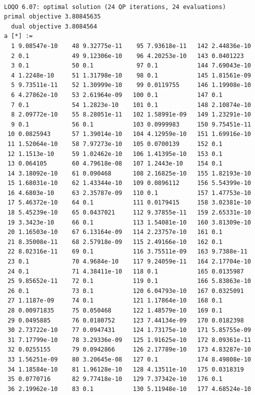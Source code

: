 \documentclass{article}
\begin{document}
\begin{verbatim}

LOQO 6.07: optimal solution (24 QP iterations, 24 evaluations)
primal objective 3.80845635
  dual objective 3.8084564
a [*] :=
  1 9.08547e-10    48 9.32775e-11    95 7.93618e-11   142 2.44836e-10
  2 0.1            49 9.12306e-10    96 4.20253e-10   143 0.0401223
  3 0.1            50 0.1            97 0.1           144 7.69043e-10
  4 1.2248e-10     51 1.31798e-10    98 0.1           145 1.81561e-09
  5 9.73511e-11    52 1.30999e-10    99 0.0119755     146 1.19908e-10
  6 4.27862e-10    53 2.61964e-09   100 0.1           147 0.1
  7 0.1            54 1.2823e-10    101 0.1           148 2.10874e-10
  8 2.09772e-10    55 8.28051e-11   102 1.58991e-09   149 1.23291e-10
  9 0.1            56 0.1           103 0.0999983     150 9.75451e-11
 10 0.0825943      57 1.39014e-10   104 4.12959e-10   151 1.69916e-10
 11 1.52064e-10    58 7.97273e-10   105 0.0700139     152 0.1
 12 1.1513e-10     59 1.02462e-10   106 1.41395e-10   153 0.1
 13 0.064105       60 4.79618e-08   107 1.2443e-10    154 0.1
 14 3.18092e-10    61 0.090468      108 2.16825e-10   155 1.82193e-10
 15 1.68031e-10    62 1.43344e-10   109 0.0896112     156 5.54399e-10
 16 4.6803e-10     63 2.35787e-09   110 0.1           157 1.47753e-10
 17 5.46372e-10    64 0.1           111 0.0179415     158 3.02381e-10
 18 5.45239e-10    65 0.0437021     112 9.37855e-11   159 2.65331e-10
 19 3.3423e-10     66 0.1           113 1.54081e-10   160 3.81309e-10
 20 1.16503e-10    67 6.13164e-09   114 2.23757e-10   161 0.1
 21 8.35008e-11    68 2.57918e-09   115 2.49166e-10   162 0.1
 22 8.02316e-11    69 0.1           116 3.75511e-09   163 9.7388e-11
 23 0.1            70 4.9684e-10    117 9.24059e-11   164 2.17704e-10
 24 0.1            71 4.38411e-10   118 0.1           165 0.0135987
 25 9.85652e-11    72 0.1           119 0.1           166 5.83863e-10
 26 0.1            73 0.1           120 6.04793e-10   167 0.0325091
 27 1.1187e-09     74 0.1           121 1.17864e-10   168 0.1
 28 0.00971835     75 0.050468      122 1.48579e-10   169 0.1
 29 0.0495885      76 0.0180752     123 7.44134e-09   170 0.0182398
 30 2.73722e-10    77 0.0947431     124 1.73175e-10   171 5.85755e-09
 31 7.17799e-10    78 3.29336e-09   125 1.91625e-10   172 8.09361e-11
 32 0.0255155      79 0.0942866     126 2.17789e-10   173 4.83287e-10
 33 1.56251e-09    80 3.20645e-08   127 0.1           174 8.49808e-10
 34 1.18584e-10    81 1.96128e-10   128 4.13511e-10   175 0.0318319
 35 0.0770716      82 9.77418e-10   129 7.37342e-10   176 0.1
 36 2.19962e-10    83 0.1           130 5.11948e-10   177 4.68524e-10

\end{verbatim}
\end{document}
